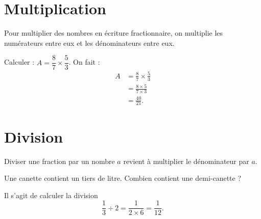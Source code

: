 \section{Multiplication}



\begin{Aretenir}
Pour multiplier des nombres en écriture fractionnaire, on multiplie les numérateurs entre eux et les dénominateurs entre eux.
\end{Aretenir}

\begin{example}
    Calculer : \( A=\dfrac{ 8 }{ 7 }\times \dfrac{ 5 }{ 3 }\). On fait :
    \begin{subequations}
        \begin{align}
            A&=\frac{ 8 }{ 7 }\times \frac{ 5 }{ 3 }\\
            &=\frac{ 8\times 5 }{ 7\times 3 }\\
            &=\frac{ 40 }{ 21 }.
        \end{align}
    \end{subequations}
\end{example}

\section{Division}



\begin{Aretenir}
   Diviser une fraction par un nombre \( a\) revient à multiplier le dénominateur par \( a\).
\end{Aretenir}


\begin{example}
    Une canette contient un tiers de litre. Combien contient une demi-canette ?

    Il s'agit de calculer la division
    \begin{equation}
        \dfrac{ 1 }{ 3 }\div 2=\frac{ 1 }{ 2\times 6 }=\frac{ 1 }{ 12 }.
    \end{equation}
\end{example}

